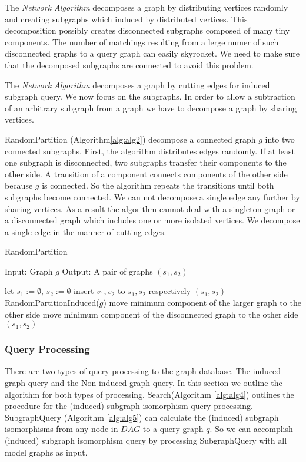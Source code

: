 The \textit{Network Algorithm} decomposes a graph by distributing vertices randomly and creating subgraphs which induced by distributed vertices.
This decomposition possibly creates disconnected subgraphs composed of many tiny components.
The number of matchings resulting from a lerge numer of such disconnected graphs to a query graph can easily skyrocket.
We need to make sure that the decomposed subgraphs are connected to avoid this problem.

The \textit{Network Algorithm} decomposes a graph by cutting edges for induced subgraph query.
We  now  focus on the subgraphs.
In order to allow a subtraction of an arbitrary subgraph from a graph we have to decompose a graph by sharing vertices.

RandomPartition (Algorithm\ref{alg:alg2}) decompose a connected graph $g$ into two connected subgraphs.
First, the algorithm distributes edges randomly.
If at least one subgraph is disconnected, two subgraphs transfer their components to the other side.
A transition of a component connects components of the other side because $g$ is connected.
So the algorithm repeats the transitions until both subgraphs become connected.
We can not decompose a single edge any further by sharing vertices.
As a result the algorithm cannot deal with a singleton graph or a disconnected graph which includes one or more isolated vertices.
We decompose a single edge in the manner of cutting edges.

\begin{algorithm}
\caption{RandomPartition}
\label{alg:alg2}
\begin{algorithmic}
\STATE Input: Graph $g$
\STATE Output: A pair of graphs $(s_1, s_2)$
\end{algorithmic}
\begin{algorithmic}[1]
\STATE let $s_1 := \emptyset$, $s_2 := \emptyset$
	\STATE insert $v_1,v_2$ to $s_1,s_2$ respectively
\ELSE
	\STATE $(s_1, s_2)$ RandomPartitionInduced($g$)
			\STATE move minimum component of the larger graph to the other side
		\ELSE
			\STATE move minimum component of the disconnected graph to the other side
		\ENDIF
	\ENDWHILE
\ENDIF
\RETURN $(s_1,s_2)$
\end{algorithmic}
\end{algorithm}

\subsubsection{Query Processing}
There are two types of query processing to the graph database. The induced graph query and the Non induced graph query. In this section we outline the algorithm
 for both types of processing.
Search(Algorithm \ref{alg:alg4}) outlines the procedure for the (induced) subgraph isomorphism query processing.
SubgraphQuery (Algorithm \ref{alg:alg5}) can calculate the (induced) subgraph isomorphisms from any node in $DAG$ to a query graph $q$.
So we can accomplish (induced) subgraph isomorphism query by processing SubgraphQuery with all model graphs as input.

